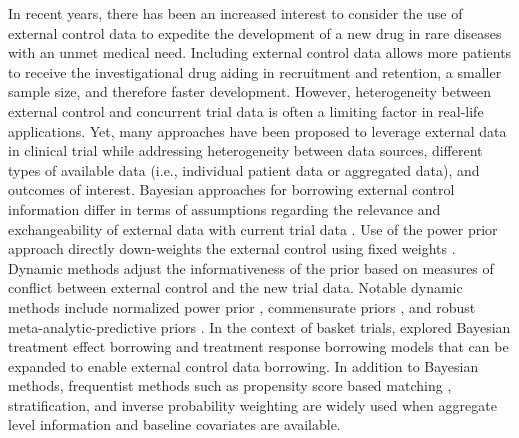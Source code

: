 In recent years, there has been an increased interest to consider the use of external control data to expedite the development of a new drug in rare diseases with an unmet medical need. Including external control data allows more patients to receive the investigational drug aiding in recruitment and retention, a smaller sample size, and therefore faster development. However, heterogeneity between external control and concurrent trial data is often a limiting factor in real-life applications. Yet, many approaches have been proposed to leverage external data in clinical trial while addressing heterogeneity between data sources, different types of available data (i.e., individual patient data or aggregated data), and outcomes of interest. Bayesian approaches for borrowing external control information differ in terms of assumptions regarding the relevance and exchangeability of external data with current trial data \citep{wadsworth2018extrapolation}. Use of the power prior approach directly down-weights the external control using fixed weights \citep{ibrahim2000power}. Dynamic methods adjust the informativeness of the prior based on measures of conflict between external control and the new trial data. Notable dynamic methods include normalized power prior \citep{duan2005modified, neuenschwander2009note}, commensurate priors \citep{hobbs2011hierarchical}, and robust meta-analytic-predictive priors \citep{spiegelhalter2004bayesian, neuenschwander2010summarizing, schmidli2014robust, neuenschwander2016use}. In the context of basket trials, \cite{ouma2022bayesian} explored Bayesian treatment effect borrowing and treatment response borrowing models that can be expanded to enable external control data borrowing. In addition to Bayesian methods, frequentist methods such as propensity score based matching \citep{rosenbaum1983central}, stratification, and inverse probability weighting \citep{lin2018propensity} are widely used when aggregate level information and baseline covariates are available. 

